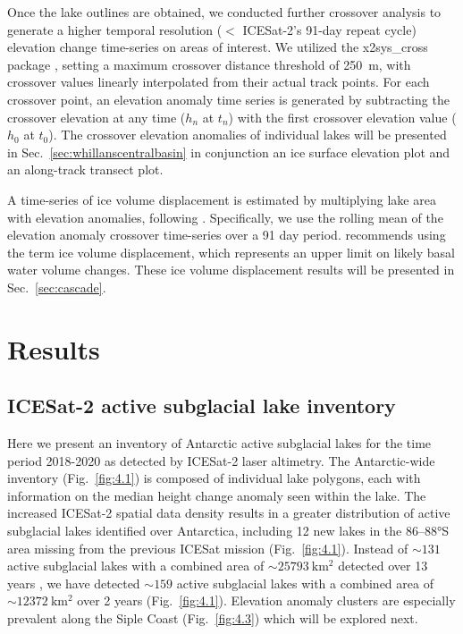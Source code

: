 Once the lake outlines are obtained, we conducted further crossover analysis to generate a higher temporal resolution ($<$ ICESat-2's 91-day repeat cycle) elevation change time-series on areas of interest.
We utilized the x2sys\_cross package \citep{WesselToolsanalyzingintersecting2010}, setting a maximum crossover distance threshold of \SI{250}{\metre}, with crossover values linearly interpolated from their actual track points.
For each crossover point, an elevation anomaly time series is generated by subtracting the crossover elevation at any time ($h_n$ at $t_n$) with the first crossover elevation value ($h_0$ at $t_0$).
The crossover elevation anomalies of individual lakes will be presented in Sec.~\ref{sec:whillanscentralbasin} in conjunction an ice surface elevation plot and an along-track transect plot.

A time-series of ice volume displacement is estimated by multiplying lake area with elevation anomalies, following \citet{SiegfriedEpisodicicevelocity2016,KimActivesubglaciallakes2016}.
Specifically, we use the rolling mean of the elevation anomaly crossover time-series over a 91 day period. %
\citet{SiegfriedEpisodicicevelocity2016} recommends using the term ice volume displacement, which represents an upper limit on likely basal water volume changes.
These ice volume displacement results will be presented in Sec.~\ref{sec:cascade}.


\section{Results}

\subsection{ICESat-2 active subglacial lake inventory}

Here we present an inventory of Antarctic active subglacial lakes for the time period 2018-2020 as detected by ICESat-2 laser altimetry.
The Antarctic-wide inventory (Fig.~\ref{fig:4.1}) is composed of individual lake polygons, each with information on the median height change anomaly seen within the lake.
The increased ICESat-2 spatial data density results in a greater distribution of active subglacial lakes identified over Antarctica, including 12 new lakes in the 86–88°S area missing from the previous ICESat mission (Fig.~\ref{fig:4.1}).
Instead of $\sim131$ active subglacial lakes with a combined area of $\sim\SI{25793}{\kilo\metre\squared}$ detected over 13 years \citep{SiegfriedThirteenyearssubglacial2018}, we have detected $\sim159$ active subglacial lakes with a combined area of $\sim\SI{12372}{\kilo\metre\squared}$ over 2 years (Fig.~\ref{fig:4.1}). %
Elevation anomaly clusters are especially prevalent along the Siple Coast (Fig.~\ref{fig:4.3}) which will be explored next.

